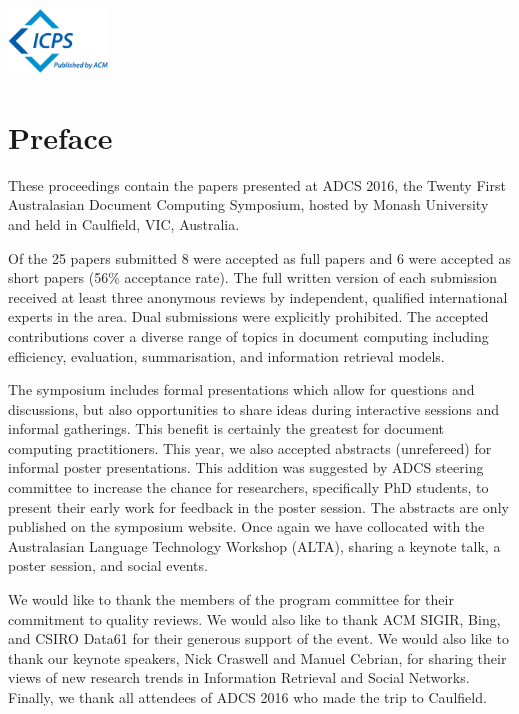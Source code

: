 \documentclass[a4paper]{article}
\begin{document}
\vspace{1in}

\hfill\includegraphics[width=0.2\textwidth]{icps-logo-plain}

\newpage

\section*{Preface}

These proceedings contain the papers presented at ADCS 2016, the Twenty First 
Australasian Document Computing Symposium, hosted by Monash University
and held in Caulfield, VIC, Australia.

Of the 25 papers submitted 8 were accepted as full papers and 6 were accepted
as short papers (56\% acceptance rate).  The  full  written  version  of each submission received at
least three anonymous reviews by independent, qualified international experts
in the area. Dual submissions were explicitly prohibited.  The accepted
contributions cover a diverse range of topics in document computing including
efficiency, evaluation, summarisation, and information retrieval
models.

The symposium includes formal presentations which allow for questions and
discussions, but also opportunities to share ideas during interactive sessions
and informal gatherings. This benefit is certainly the greatest for document
computing practitioners. This year, we also accepted abstracts (unrefereed) for informal poster presentations. This addition was suggested by ADCS steering committee to increase the chance for researchers, specifically PhD students, to present their early work for feedback in the poster session. The abstracts are only published on the symposium website. Once again we have collocated with the Australasian
Language Technology Workshop (ALTA), sharing  a  keynote  talk, a poster session, and social events.

We would like to thank the members of the program committee for their
commitment to quality reviews. We would also like to thank ACM SIGIR, Bing, and
CSIRO Data61 for their generous support of the event. We would
also like to thank our keynote speakers, Nick Craswell and Manuel Cebrian, for sharing their views of new
research trends in Information Retrieval and Social Networks. Finally, we thank all attendees of
ADCS 2016 who made the trip to Caulfield.
\end{document}

